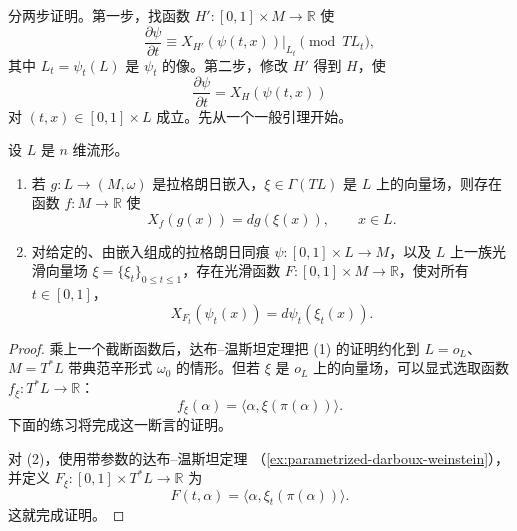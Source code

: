 分两步证明。第一步，找函数 $H':[0,1]\times M\to\mathbb R$ 使
\begin{equation}
 \frac{\partial\psi}{\partial t}
 \equiv X_{H'}(\psi(t,x))|_{L_t}\pmod{TL_t},
 \label{eq:exact-isotopy-normal-extension}
\end{equation}
其中 $L_t=\psi_t(L)$ 是 $\psi_t$ 的像。第二步，修改 $H'$ 得到 $H$，使
\begin{equation}
 \frac{\partial\psi}{\partial t}=X_H(\psi(t,x))
 \label{eq:exact-isotopy-full-extension}
\end{equation}
对 $(t,x)\in[0,1]\times L$ 成立。先从一个一般引理开始。

\begin{lemma}\label{lem:tangent-hamiltonian-extension}
设 $L$ 是 $n$ 维流形。
\begin{enumerate}[label=(\arabic*)]
\item 若 $g:L\to(M,\omega)$ 是拉格朗日嵌入，$\xi\in\Gamma(TL)$ 是 $L$ 上的向量场，则存在函数 $f:M\to\mathbb R$ 使
\begin{equation}
 X_f(g(x))=dg(\xi(x)),\qquad x\in L.
 \label{eq:tangent-vector-field-hamiltonian-extension}
\end{equation}
\item 对给定的、由嵌入组成的拉格朗日同痕
$\psi:[0,1]\times L\to M$，以及 $L$ 上一族光滑向量场
$\xi=\{\xi_t\}_{0\le t\le1}$，存在光滑函数
$F:[0,1]\times M\to\mathbb R$，使对所有 $t\in[0,1]$，
\begin{equation}
 X_{F_t}(\psi_t(x))=d\psi_t(\xi_t(x)).
 \label{eq:parametrized-tangent-hamiltonian-extension}
\end{equation}
\end{enumerate}
\end{lemma}

\begin{proof}
乘上一个截断函数后，达布--温斯坦定理把 (1) 的证明约化到
$L=o_L$、$M=T^*L$ 带典范辛形式 $\omega_0$ 的情形。但若 $\xi$ 是 $o_L$ 上的向量场，可以显式选取函数 $f_\xi:T^*L\to\mathbb R$：
\begin{equation}
 f_\xi(\alpha)=\langle\alpha,\xi(\pi(\alpha))\rangle.
 \label{eq:fiber-linear-hamiltonian}
\end{equation}
下面的练习将完成这一断言的证明。

对 (2)，使用带参数的达布--温斯坦定理
（\cref{ex:parametrized-darboux-weinstein}），并定义
$F_\xi:[0,1]\times T^*L\to\mathbb R$ 为
\[
 F(t,\alpha)=\langle\alpha,\xi_t(\pi(\alpha))\rangle.
\]
这就完成证明。
\end{proof}

